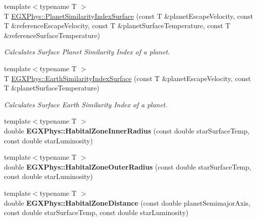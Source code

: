 \begin{DoxyCompactItemize}
\mbox{\label{group___astrophysics_gae0c7dce2779d66b0560ca388a34ddc39}} 
{\footnotesize template$<$typename T $>$ }\\T \hyperlink{group___astrophysics_gae0c7dce2779d66b0560ca388a34ddc39}{E\+G\+X\+Phys\+::\+Planet\+Similarity\+Index\+Surface} (const T \&planet\+Escape\+Velocity, const T \&reference\+Escape\+Velocity, const T \&planet\+Surface\+Temperature, const T \&reference\+Surface\+Temperature)
\begin{DoxyCompactList}\small\item\em Calculates Surface Planet Similarity Index of a planet. \end{DoxyCompactList}\item 
\mbox{\label{group___astrophysics_ga1df772b0ed354ca7f7e4a7a4af072325}} 
{\footnotesize template$<$typename T $>$ }\\T \hyperlink{group___astrophysics_ga1df772b0ed354ca7f7e4a7a4af072325}{E\+G\+X\+Phys\+::\+Earth\+Similarity\+Index\+Surface} (const T \&planet\+Escape\+Velocity, const T \&planet\+Surface\+Temperature)
\begin{DoxyCompactList}\small\item\em Calculates Surface Earth Similarity Index of a planet. \end{DoxyCompactList}\item 
\mbox{\label{group___astrophysics_ga17e667a233c12e3e05aed3fdf08d1156}} 
{\footnotesize template$<$typename T $>$ }\\double {\bfseries E\+G\+X\+Phys\+::\+Habital\+Zone\+Inner\+Radius} (const double star\+Surface\+Temp, const double star\+Luminosity)
\item 
\mbox{\label{group___astrophysics_gacdb0f5c44bfad08164ae26b5b098be45}} 
{\footnotesize template$<$typename T $>$ }\\double {\bfseries E\+G\+X\+Phys\+::\+Habital\+Zone\+Outer\+Radius} (const double star\+Surface\+Temp, const double star\+Luminosity)
\item 
\mbox{\label{group___astrophysics_ga227538d5ee00f66a5524a1daafd8dc26}} 
{\footnotesize template$<$typename T $>$ }\\double {\bfseries E\+G\+X\+Phys\+::\+Habital\+Zone\+Distance} (const double planet\+Semimajor\+Axis, const double star\+Surface\+Temp, const double star\+Luminosity)

\end{DoxyCompactItemize}
